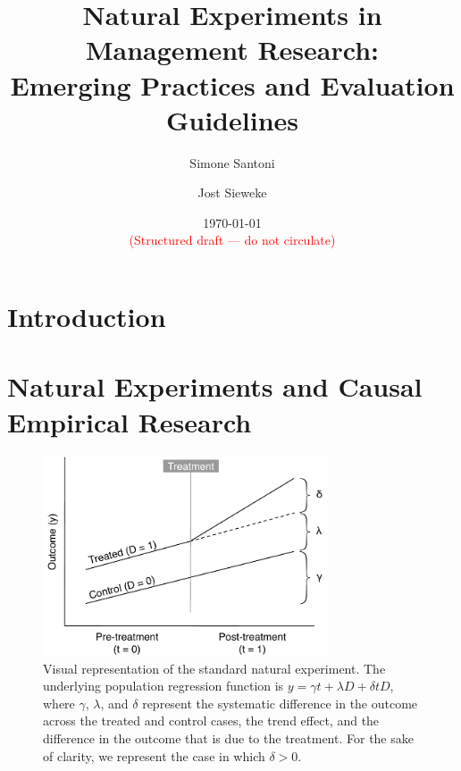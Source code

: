\documentclass[nobib]{tufte-handout}
\title[Natural Experiments in Management Research]
{Natural Experiments in Management Research:\\Emerging Practices and 
Evaluation Guidelines\vspace{2em}}
\author[$\bullet\circ$]{Simone Santoni}
\author[$\star$]{Jost Sieweke}
\affil[$\bullet$]{Bayes Business School (formerly Cass)}
\affil[$\circ$]{Soundcloud}
\affil[$\star$]{Vrije Universiteit Amsterdam}
\date{\vspace{1em} \normalsize \today \vspace{1em} \\ 
      \textcolor{red}{(Structured draft --- do not circulate)}}
\begin{document}
\maketitle

%
%
%

\clearpage

\begin{refsection}

\section{Introduction}
\label{introduction}



\section{Natural Experiments and Causal Empirical Research}
\label{sec:standard_ne}



\begin{figure}[]
    \centering
    \includegraphics[width=0.75\textwidth]{exhibits/ne_logic_viz.pdf}
    \caption{Visual representation of the standard natural experiment. 
        The underlying population regression function is $y = \gamma t +
        \lambda D + \delta t D$, where $\gamma$, $\lambda$, and $\delta$ represent 
        the systematic difference in the outcome across the treated and control 
        cases, the trend effect, and the difference in the outcome that is due to
        the treatment. For the sake of clarity, we represent the case in which
        $\delta > 0$.}
    \label{fig:ne_logic_viz}
\end{figure}


\end{refsection}
\end{document}
